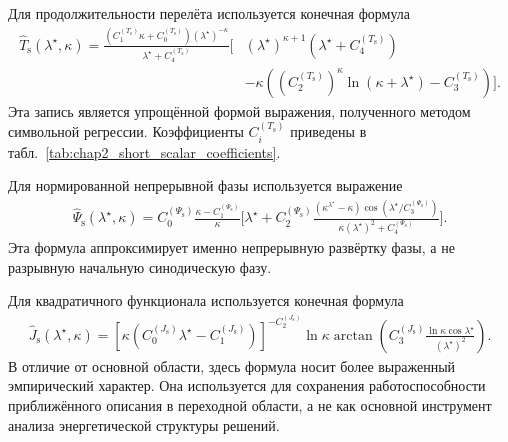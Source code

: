 Для продолжительности перелёта используется конечная формула
\begin{equation}
	\begin{split}
		\widehat{T}_{\mathrm{s}}\left(\lambda^\star,\kappa\right)
		=
		\frac{
			\left(C_1^{(T_{\mathrm{s}})}\kappa+C_0^{(T_{\mathrm{s}})}\right)
			\left(\lambda^\star\right)^{-\kappa}
		}{
			\lambda^\star+C_4^{(T_{\mathrm{s}})}
		}
		\Big[
		&\left(\lambda^\star\right)^{\kappa+1}
		\left(\lambda^\star+C_4^{(T_{\mathrm{s}})}\right)
		\\
		&-
		\kappa
		\left(
		\left(C_2^{(T_{\mathrm{s}})}\right)^\kappa
		\ln\left(\kappa+\lambda^\star\right)
		-
		C_3^{(T_{\mathrm{s}})}
		\right)
		\Big].
	\end{split}
\end{equation}
Эта запись является упрощённой формой выражения, полученного методом символьной регрессии. Коэффициенты $C_i^{(T_{\mathrm{s}})}$ приведены в табл.~\ref{tab:chap2_short_scalar_coefficients}.

Для нормированной непрерывной фазы используется выражение
\begin{equation}
	\begin{split}
		\widehat{\Psi}_{\mathrm{s}}\left(\lambda^\star,\kappa\right)
		=
		C_0^{(\Psi_{\mathrm{s}})}
		\frac{\kappa-C_1^{(\Psi_{\mathrm{s}})}}{\kappa}
		\Bigg[
		\lambda^\star
		+
		C_2^{(\Psi_{\mathrm{s}})}
		\frac{
			\left(\kappa^{\lambda^\star}-\kappa\right)
			\cos\left(\lambda^\star/C_3^{(\Psi_{\mathrm{s}})}\right)
		}{
			\kappa\left(\lambda^\star\right)^2+C_4^{(\Psi_{\mathrm{s}})}
		}
		\Bigg].
	\end{split}
\end{equation}
Эта формула аппроксимирует именно непрерывную развёртку фазы, а не разрывную начальную синодическую фазу.

Для квадратичного функционала используется конечная формула
\begin{equation}
	\begin{split}
		\widehat{J}_{\mathrm{s}}\left(\lambda^\star,\kappa\right)
		=
		\left[
		\kappa
		\left(
		C_0^{(J_{\mathrm{s}})}\lambda^\star-C_1^{(J_{\mathrm{s}})}
		\right)
		\right]^{-C_2^{(J_{\mathrm{s}})}}
		\ln\kappa
		\arctan
		\left(
		C_3^{(J_{\mathrm{s}})}
		\frac{
			\ln\kappa\cos\lambda^\star
		}{
			\left(\lambda^\star\right)^2
		}
		\right).
	\end{split}
\end{equation}
В отличие от основной области, здесь формула носит более выраженный эмпирический характер. Она используется для сохранения работоспособности приближённого описания в переходной области, а не как основной инструмент анализа энергетической структуры решений.

